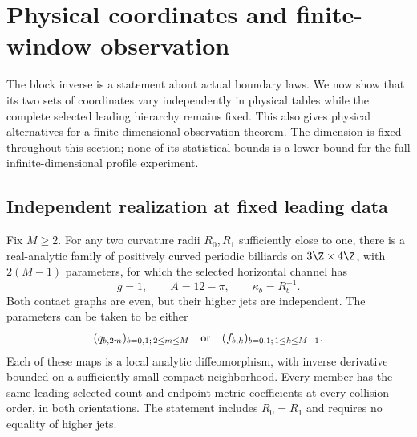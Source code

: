\section{Physical coordinates and finite-window observation}
\label{sec:v12-physical-image}
The block inverse is a statement about actual boundary laws. We now
show that its two sets of coordinates vary independently in physical
tables while the complete selected leading hierarchy remains fixed.
This also gives physical alternatives for a finite-dimensional
observation theorem. The dimension is fixed throughout this section;
none of its statistical bounds is a lower bound for the full
infinite-dimensional profile experiment.

\subsection{Independent realization at fixed leading data}
\begin{theorem}
\label{thm:v12-realization}
Fix $M\ge2$. For any two curvature radii $R_0,R_1$ sufficiently
close to one, there is a real-analytic family of positively curved
periodic billiards on $3\Z\times4\Z$, with $2(M-1)$ parameters,
for which the selected horizontal channel has
\[
             g=1,\qquad A=12-\pi,\qquad \kappa_b=R_b^{-1}.
\]
Both contact graphs are even, but their higher jets are independent.
The parameters can be taken to be either
\[
       (q_{b,2m})_{b=0,1;\,2\le m\le M}
       \quad\hbox{or}\quad
       (f_{b,k})_{b=0,1;\,1\le k\le M-1}.
\]
Each of these maps is a local analytic diffeomorphism, with inverse
derivative bounded on a sufficiently small compact neighborhood.
Every member has the same leading selected count and endpoint-metric
coefficients at every collision order, in both orientations. The
statement includes $R_0=R_1$ and requires no equality of higher jets.
\end{theorem}
